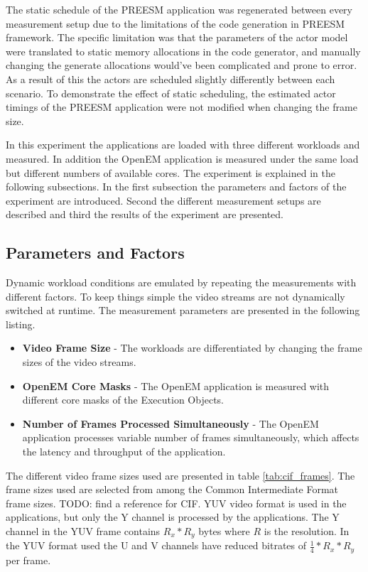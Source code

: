 The static schedule of the PREESM application was regenerated between every
measurement setup due to the limitations of the code generation in PREESM
framework. The specific limitation was that the parameters of the actor model
were translated to static memory allocations in the code generator, and manually
changing the generate allocations would've been complicated and prone to error.
As a result of this the actors are scheduled slightly differently between each
scenario. To demonstrate the effect of static scheduling, the estimated actor
timings of the PREESM application were not modified when changing the frame
size.

In this experiment the applications are loaded with three different workloads
and measured. In addition the OpenEM application is measured under the same load
but different numbers of available cores. The experiment is explained in the
following subsections. In the first subsection the parameters and factors of the
experiment are introduced. Second the different measurement setups are described
and third the results of the experiment are presented.

\subsection{Parameters and Factors}
Dynamic workload conditions are emulated by repeating the measurements with
different factors. To keep things simple the video streams are not dynamically
switched at runtime. The measurement parameters are presented in the following
listing.

\begin{itemize}
    \item \textbf{Video Frame Size} - The workloads are differentiated by
        changing the frame sizes of the video streams.
    \item \textbf{OpenEM Core Masks} - The OpenEM application is measured
        with different core masks of the Execution Objects.
    \item \textbf{Number of Frames Processed Simultaneously} - The OpenEM
        application processes variable number of frames simultaneously, which
        affects the latency and throughput of the application.
\end{itemize}

The different video frame sizes used are presented in table
\ref{tab:cif_frames}. The frame sizes used are selected from among the Common
Intermediate Format frame sizes. TODO: find a reference for CIF. YUV video
format is used in the applications, but only the Y channel is processed by the
applications. The Y channel in the YUV frame contains $R_{x} * R_{y}$ bytes
where $R$ is the resolution. In the YUV format used the U and V channels have
reduced bitrates of $\frac{1}{4} * R_{x} * R_{y}$ per frame.

